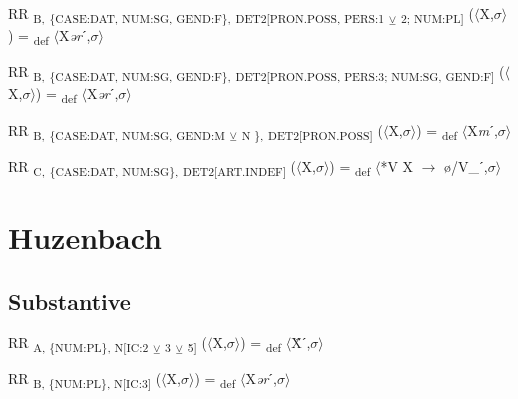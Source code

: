 {\begin{exe}
 RR \textsubscript{B,} \textsubscript{\{CASE:DAT, NUM:SG, GEND:F\},} \textsubscript{DET2[PRON.POSS, PERS:1} \textsubscript{${\veebar}$}\textsubscript{ 2; NUM:PL]} ($\langle$X,$\sigma $$\rangle$) = \textsubscript{def} $\langle$X\textit{ər}ˊ,$\sigma $$\rangle$
\end{exe}

\begin{exe}
 RR \textsubscript{B,} \textsubscript{\{CASE:DAT, NUM:SG, GEND:F\},} \textsubscript{DET2[PRON.POSS, PERS:3; NUM:SG, GEND:F]} ($\langle$X,$\sigma $$\rangle$) = \textsubscript{def} $\langle$X\textit{ər}ˊ,$\sigma $$\rangle$
\end{exe}

\begin{exe}
 RR \textsubscript{B,} \textsubscript{\{CASE:DAT, NUM:SG, GEND:M} \textsubscript{${\veebar}$}\textsubscript{ N \},} \textsubscript{DET2[PRON.POSS]} ($\langle$X,$\sigma $$\rangle$) = \textsubscript{def} $\langle$X\textit{m}ˊ,$\sigma $$\rangle$
\end{exe}

\begin{exe}
 RR \textsubscript{C,} \textsubscript{\{CASE:DAT, NUM:SG\},} \textsubscript{DET2[ART.INDEF]} ($\langle$X,$\sigma $$\rangle$) = \textsubscript{def} $\langle$*V X $\rightarrow$ ø/V\_ˊ,$\sigma $$\rangle$
\end{exe}

\section{Huzenbach}

\subsection{Substantive}

\begin{exe}
 RR \textsubscript{A, \{NUM:PL\}, N[IC:2} \textsubscript{${\veebar}$}\textsubscript{ 3} \textsubscript{${\veebar}$}\textsubscript{ 5]} ($\langle$X,$\sigma $$\rangle$) = \textsubscript{def} $\langle$Ẍˊ,$\sigma $$\rangle$
\end{exe}

\begin{exe}
 RR \textsubscript{B, \{NUM:PL\}, N[IC:3]} ($\langle$X,$\sigma $$\rangle$) = \textsubscript{def} $\langle$X\textit{ər}ˊ,$\sigma $$\rangle$
\end{exe}

}
